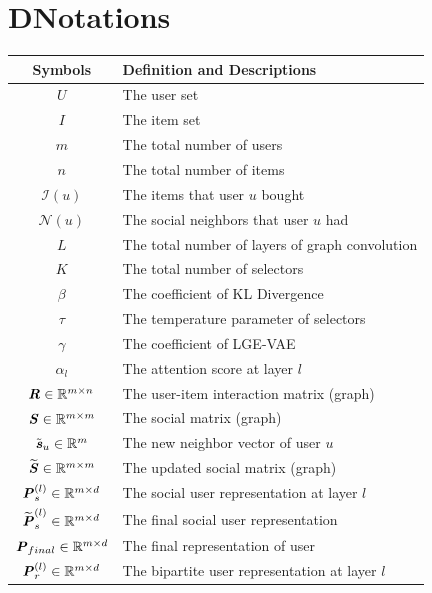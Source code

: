 \documentclass[letterpaper]{article} %
\begin{document}
\section{D{\quad}Notations}
\begin{supertabular}{c|p{5.7cm}}
    \hline
     Symbols &Definition and Descriptions \\ \hline\hline
     $U$    &The user set\\ \hline
     $I$    &The item set\\ \hline
     $m$    &The total number of users\\ \hline
     $n$    &The total number of items\\ \hline
     $\mathcal{I}(u)$   &The items that user $u$ bought\\ \hline
     $\mathcal{N}(u)$   &The social neighbors that user $u$ had\\ \hline
     $L$    &The total number of layers of graph convolution\\ \hline
     $K$    &The total number of selectors\\ \hline
     $\beta$    &The coefficient of KL Divergence\\ \hline
     $\tau$ &The temperature parameter of selectors\\ \hline
     $\gamma$   &The coefficient of LGE-VAE\\ \hline
     $\alpha_l$ &The attention score at layer $l$\\ \hline
     $\textbf{\textit{R}}\in \mathbb{R}^{m\times n}$  &The user-item interaction matrix (graph)\\ \hline
     $\textbf{\textit{S}}\in \mathbb{R}^{m\times m}$  &The social matrix (graph)\\ \hline
     $\tilde{\textbf{\textit{s}}}_u \in \mathbb{R}^{m}$ &The new neighbor vector of user $u$\\ \hline
     $\widetilde{\textbf{\textit{S}}}\in \mathbb{R}^{m\times m}$ &The updated social matrix (graph)\\ \hline
     $\textbf{\textit{P}}^{(l)}_{s}\in \mathbb{R}^{m\times d}$    &The social user representation at layer $l$\\ \hline
     $\widetilde{\textbf{\textit{P}}}^{(l)}_{s}\in \mathbb{R}^{m\times d}$    &The final social user representation\\ \hline
     $\textbf{\textit{P}}_{final}\in \mathbb{R}^{m\times d}$    &The final representation of user\\ \hline
     $\textbf{\textit{P}}^{(l)}_{r}\in \mathbb{R}^{m\times d}$    &The bipartite user representation at layer $l$\\ \hline

\end{supertabular}
\end{document}
